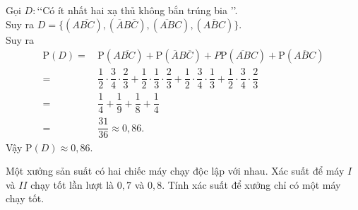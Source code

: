 \begin{bt}
{\begin{center}
	\end{center}
		Gọi $D:$\lq\lq Có ít nhất hai xạ thủ không bắn trúng bia \rq\rq.\\
		Suy ra $D=\{(A\overline{BC}), (\overline{A}B\overline{C}), (\overline{AB}C), (\overline{ABC})\}$.\\
		Suy ra 
		\begin{align*}
			\mathrm{P}(D)=&\, \mathrm{P}(A\overline{BC})+\mathrm{P}(\overline{A}B\overline{C})+P\mathrm{P}(\overline{AB}C)+\mathrm{P}(\overline{ABC})\\
			=&\, \dfrac{1}{2}\cdot\dfrac{3}{4}\cdot\dfrac{2}{3}+\dfrac{1}{2}\cdot\dfrac{1}{3}\cdot\dfrac{2}{3}+\dfrac{1}{2}\cdot\dfrac{3}{4}\cdot\dfrac{1}{3}+\dfrac{1}{2}\cdot\dfrac{3}{4}\cdot\dfrac{2}{3}\\
			=&\, \dfrac{1}{4}+\dfrac{1}{9}+\dfrac{1}{8}+\dfrac{1}{4}\\
			=&\, \dfrac{31}{36}\approx 0{,}86.
		\end{align*}
		Vậy $\mathrm{P}(D)\approx 0{,}86$.
	}
\end{bt}

\begin{bt}%
	Một xưởng sản suất có hai chiếc máy chạy độc lập với nhau. Xác suất để máy $I$ và $II$ chạy tốt lần lượt là $0{,}7$ và $0{,}8$. Tính xác suất để xưởng chỉ có một máy chạy tốt.
\end{bt}

